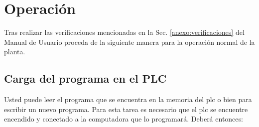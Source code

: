 \section{Operación}
\label{anexo:operacion}

Tras realizar las verificaciones mencionadas en la Sec. 
\ref{anexo:verificaciones} del Manual de Usuario proceda de la siguiente
manera para la operación normal de la planta.

\subsection{Carga del programa en el PLC}
\label{anexo:operacionPLC}

Usted puede leer el programa que se encuentra en la memoria del \gls{plc} o bien
para escribir un nuevo programa.
Para esta tarea es necesario que el \gls{plc} se encuentre encendido y
conectado a la computadora que lo programará.
Deberá entonces:


